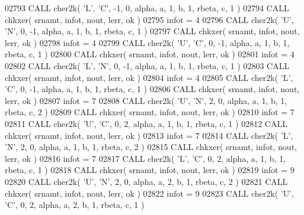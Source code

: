 \begin{DoxyCode}
02793       \textcolor{keyword}{CALL }cher2k( \textcolor{stringliteral}{'L'}, \textcolor{stringliteral}{'C'}, -1, 0, alpha, a, 1, b, 1, rbeta, c, 1 )
02794       \textcolor{keyword}{CALL }chkxer( srnamt, infot, nout, lerr, ok )
02795       infot = 4
02796       \textcolor{keyword}{CALL }cher2k( \textcolor{stringliteral}{'U'}, \textcolor{stringliteral}{'N'}, 0, -1, alpha, a, 1, b, 1, rbeta, c, 1 )
02797       \textcolor{keyword}{CALL }chkxer( srnamt, infot, nout, lerr, ok )
02798       infot = 4
02799       \textcolor{keyword}{CALL }cher2k( \textcolor{stringliteral}{'U'}, \textcolor{stringliteral}{'C'}, 0, -1, alpha, a, 1, b, 1, rbeta, c, 1 )
02800       \textcolor{keyword}{CALL }chkxer( srnamt, infot, nout, lerr, ok )
02801       infot = 4
02802       \textcolor{keyword}{CALL }cher2k( \textcolor{stringliteral}{'L'}, \textcolor{stringliteral}{'N'}, 0, -1, alpha, a, 1, b, 1, rbeta, c, 1 )
02803       \textcolor{keyword}{CALL }chkxer( srnamt, infot, nout, lerr, ok )
02804       infot = 4
02805       \textcolor{keyword}{CALL }cher2k( \textcolor{stringliteral}{'L'}, \textcolor{stringliteral}{'C'}, 0, -1, alpha, a, 1, b, 1, rbeta, c, 1 )
02806       \textcolor{keyword}{CALL }chkxer( srnamt, infot, nout, lerr, ok )
02807       infot = 7
02808       \textcolor{keyword}{CALL }cher2k( \textcolor{stringliteral}{'U'}, \textcolor{stringliteral}{'N'}, 2, 0, alpha, a, 1, b, 1, rbeta, c, 2 )
02809       \textcolor{keyword}{CALL }chkxer( srnamt, infot, nout, lerr, ok )
02810       infot = 7
02811       \textcolor{keyword}{CALL }cher2k( \textcolor{stringliteral}{'U'}, \textcolor{stringliteral}{'C'}, 0, 2, alpha, a, 1, b, 1, rbeta, c, 1 )
02812       \textcolor{keyword}{CALL }chkxer( srnamt, infot, nout, lerr, ok )
02813       infot = 7
02814       \textcolor{keyword}{CALL }cher2k( \textcolor{stringliteral}{'L'}, \textcolor{stringliteral}{'N'}, 2, 0, alpha, a, 1, b, 1, rbeta, c, 2 )
02815       \textcolor{keyword}{CALL }chkxer( srnamt, infot, nout, lerr, ok )
02816       infot = 7
02817       \textcolor{keyword}{CALL }cher2k( \textcolor{stringliteral}{'L'}, \textcolor{stringliteral}{'C'}, 0, 2, alpha, a, 1, b, 1, rbeta, c, 1 )
02818       \textcolor{keyword}{CALL }chkxer( srnamt, infot, nout, lerr, ok )
02819       infot = 9
02820       \textcolor{keyword}{CALL }cher2k( \textcolor{stringliteral}{'U'}, \textcolor{stringliteral}{'N'}, 2, 0, alpha, a, 2, b, 1, rbeta, c, 2 )
02821       \textcolor{keyword}{CALL }chkxer( srnamt, infot, nout, lerr, ok )
02822       infot = 9
02823       \textcolor{keyword}{CALL }cher2k( \textcolor{stringliteral}{'U'}, \textcolor{stringliteral}{'C'}, 0, 2, alpha, a, 2, b, 1, rbeta, c, 1 )

\end{DoxyCode}
